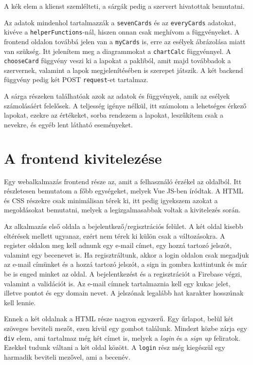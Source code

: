 \noindent A kék elem a klienst szemlélteti, a sárgák pedig a szervert hivatottak bemutatni.

Az adatok mindenhol tartalmazzák a \texttt{sevenCards} és az \texttt{everyCards} adatokat, kivéve a \texttt{helperFunctions}-nál, hiszen onnan csak meghívom a függvényeket. A frontend oldalon továbbá jelen van a \texttt{myCards} is, erre az esélyek ábrázolása miatt van szükség. Itt jelenítem meg a diagrammokat a \texttt{chartCalc} függvénnyel. A \texttt{chooseCard} függvény veszi ki a lapokat a pakliból, amit majd továbbadok a szervernek, valamint a lapok megjelenítésében is szerepet játszik. A két backend függvény pedig két POST \texttt{request}-et tartalmaz.

A sárga részeken találhatóak azok az adatok és függvények, amik az esélyek számolásáért felelősek. A teljesség igénye nélkül, itt számolom a lehetséges érkező lapokat, ezekre az értékeket, sorba rendezem a lapokat, leszűkítem csak a nevekre, és egyéb lent látható eseményeket.

\section{A frontend kivitelezése}

Egy webalkalmazás frontend része az, amit a felhasználó érzékel az oldalból. Itt részletesen bemutatom a főbb egységeket, melyek Vue JS-ben íródtak. A HTML és CSS részekre csak minimálisan térek ki, itt pedig igyekszem azokat a megoldásokat bemutatni, melyek a legizgalmasabbak voltak a kivitelezés során. 


Az alkalmazás első oldala a bejelentkező/regisztrációs felület. A két oldal kisebb eltérések mellett ugyanaz, ezért nem térek ki külön csak a változásokra. A register oldalon meg kell adnunk egy e-mail címet, egy hozzá tartozó jelszót, valamint egy becenevet is. Ha regisztráltunk, akkor a login oldalon csak megadjuk az e-mail címünket és a hozzá tartozó jelszót, a sign in gombra kattintunk és már be is enged minket az oldal. A bejelentkezést és a regisztrációt a Firebase végzi, valamint a validációt is. Az e-mail címnek tartalmaznia kell egy kukac jelet, illetve pontot és egy domain nevet. A jelszónak legalább hat karakter hosszúnak kell lennie.

Ennek a két oldalnak a HTML része nagyon egyszerű. Egy űrlapot, belül két szöveges beviteli mezőt, ezen kívül egy gombot találunk. Mindezt közbe zárja egy \texttt{div} elem, ami tartalmaz még két címet is, melyek a \textit{login} és a \textit{sign up} feliratok. Ezekkel tudunk váltani a két oldal között. A \texttt{login} rész még kiegészül egy harmadik beviteli mezővel, ami a becenév.

